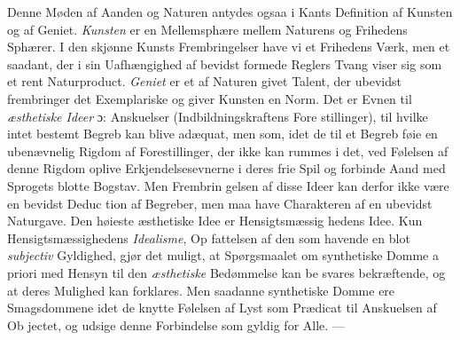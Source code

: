 \documentclass[12pt,a4paper]{book}
\begin{document}
Denne Møden af Aanden og Naturen antydes ogsaa i
Kants Definition af Kunsten og af Geniet. \emph{Kunsten} er en
Mellemsphære mellem Naturens og Frihedens Sphærer. I den
skjønne Kunsts Frembringelser have vi et Frihedens Værk,
men et saadant, der i sin Uafhængighed af bevidst formede
Reglers Tvang viser sig som et rent Naturproduct. \emph{Geniet}
er et af Naturen givet Talent, der ubevidst frembringer det
Exemplariske og giver Kunsten en Norm. Det er Evnen til
\emph{æsthetiske Ideer} ɔ: Anskuelser (Indbildningskraftens Fore\-%
stillinger), til hvilke intet bestemt Begreb kan blive adæquat,
men som, idet de til et Begreb føie en ubenævnelig Rigdom
af Forestillinger, der ikke kan rummes i det, ved Følelsen af
denne Rigdom oplive Erkjendelsesevnerne i deres frie Spil og
forbinde Aand med Sprogets blotte Bogstav. Men Frembrin\-%
gelsen af disse Ideer kan derfor ikke være en bevidst Deduc\-%
tion af Begreber, men maa have Charakteren af en ubevidst
Naturgave. Den høieste æsthetiske Idee er Hensigtsmæssig\-%
hedens Idee. Kun Hensigtsmæssighedens \emph{Idealisme}, Op\-%
fattelsen af den som havende en blot \emph{subjectiv} Gyldighed,
gjør det muligt, at Spørgsmaalet om synthetiske Domme
a priori med Hensyn til den \emph{æsthetiske} Bedømmelse kan be\-%
svares bekræftende, og at deres Mulighed kan forklares. Men
saadanne synthetiske Domme ere Smagsdommene idet de
knytte Følelsen af Lyst som Prædicat til Anskuelsen af Ob\-%
jectet, og udsige denne Forbindelse som gyldig for Alle. ---
\end{document}
